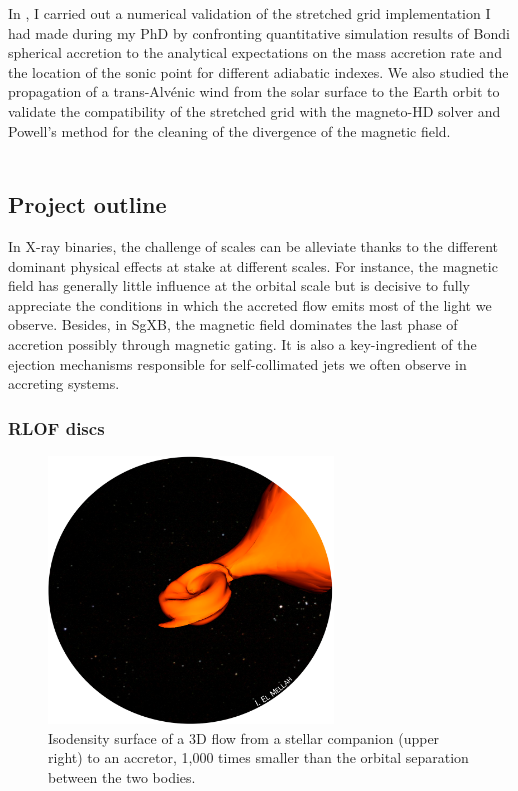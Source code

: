 \documentclass[a4paper,12pt,onecolumn]{article}
\begin{document}
\indent In \cite{Xia2017}, I carried out a numerical validation of the stretched grid implementation I had made during my PhD by confronting quantitative simulation results of Bondi spherical accretion to the analytical expectations on the mass accretion rate and the location of the sonic point for different adiabatic indexes. We also studied the propagation of a trans-Alv\'enic wind from the solar surface to the Earth orbit to validate the compatibility of the stretched grid with the magneto-HD solver and Powell's method for the cleaning of the divergence of the magnetic field.\\ \\

\subsection*{Project outline}

In X-ray binaries, the challenge of scales can be alleviate thanks to the different dominant physical effects at stake at different scales. For instance, the magnetic field has generally little influence at the orbital scale but is decisive to fully appreciate the conditions in which the accreted flow emits most of the light we observe. Besides, in SgXB, the magnetic field dominates the last phase of accretion possibly through magnetic gating. It is also a key-ingredient of the ejection mechanisms responsible for self-collimated jets we often observe in accreting systems.

\subsubsection*{RLOF discs}

\begin{figure}
\vspace*{-1.5cm}
\hspace*{0.1cm}
\includegraphics[height=7.1cm]{Figures/RLOF.png}
\caption{Isodensity surface of a 3D flow from a stellar companion (upper right) to an accretor, 1,000 times smaller than the orbital separation between the two bodies.}
\label{fig:bow2.5d}
\end{figure} 
\end{document}
